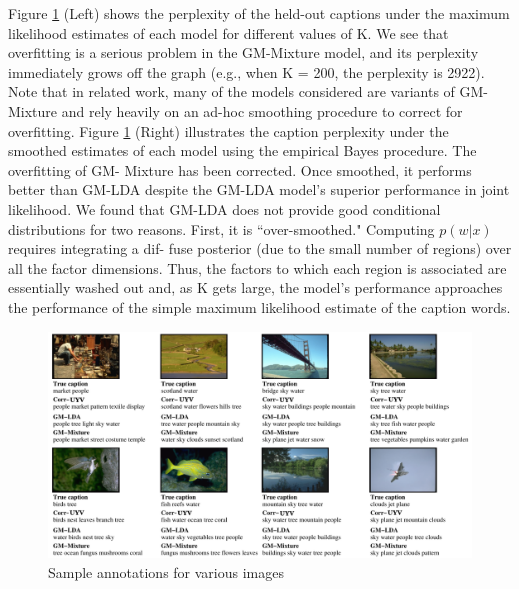 Figure \ref{fig:uyv-fig} (Left) shows the perplexity of the held-out captions under the maximum likelihood estimates of each model for different values of K. We see that overfitting is a serious problem in the GM-Mixture model, and its perplexity immediately grows off the graph (e.g., when K = 200, the perplexity is 2922). Note that in related work, many of the models considered are variants of GM-Mixture and rely heavily on an ad-hoc smoothing procedure to correct for overfitting. Figure \ref{fig:uyv-fig} (Right) illustrates the caption perplexity under
the smoothed estimates of each model using the empirical Bayes procedure. The overfitting of GM- Mixture has been corrected. Once smoothed, it performs better than GM-LDA despite the GM-LDA model’s superior performance in joint likelihood. We found that GM-LDA does not provide good conditional distributions for two reasons. First, it is ``over-smoothed." Computing $p(w| x)$ requires integrating a dif- fuse posterior (due to the small number of regions) over all the factor dimensions. Thus, the factors to which each region is associated are essentially washed out and, as K gets large, the model’s performance approaches the performance of the simple maximum likelihood estimate of the caption words.

\begin{figure}
  \centering
    \hspace*{-1.5cm}\includegraphics[height=0.40\textheight]{./Chap5/plots/figs/Fig2.png}
  \caption{Sample annotations for various images}
  \label{fig:uyv-fig}
\end{figure}

